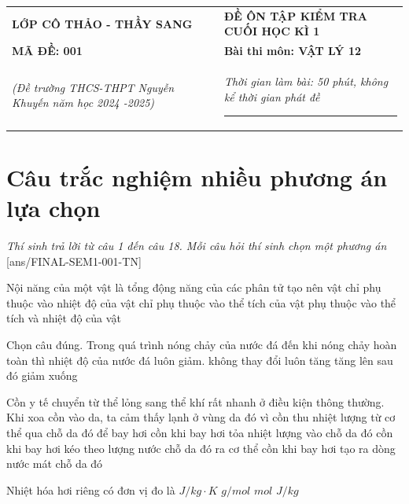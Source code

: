 \begin{tabular}{M{7.5cm}M{10.5cm}}
	\textbf{LỚP CÔ THẢO - THẦY SANG}& \textbf{ĐỀ ÔN TẬP KIỂM TRA CUỐI HỌC KÌ 1}\\
	\textbf{MÃ ĐỀ: 001}& \textbf{Bài thi môn: VẬT LÝ 12}\\
	\textit{(Đề trường THCS-THPT Nguyễn Khuyến năm học 2024 -2025)}& \textit{Thời gian làm bài: 50 phút, không kể thời gian phát đề}
	
	\noindent\rule{4cm}{0.8pt} \\
\end{tabular}
\setcounter{section}{0}
\section{Câu trắc nghiệm nhiều phương án lựa chọn}
\textit{Thí sinh trả lời từ câu 1 đến câu 18. Mỗi câu hỏi thí sinh chọn một phương án}
\setcounter{ex}{0}
[ans/FINAL-SEM1-001-TN]
\begin{ex}
	Nội năng của một vật
	\choice
	{là tổng động năng của các phân tử tạo nên vật}
	{chỉ phụ thuộc vào nhiệt độ của vật}
	{chỉ phụ thuộc vào thể tích của vật}
	{\True phụ thuộc vào thể tích và nhiệt độ của vật}
	\loigiai{}
\end{ex}
\begin{ex}
	Chọn câu đúng. Trong quá trình nóng chảy của nước đá đến khi nóng chảy hoàn toàn thì nhiệt độ của nước đá 
	\choice
	{luôn giảm.}
	{\True không thay đổi}
	{luôn tăng}
	{tăng lên sau đó giảm xuống}
	\loigiai{}
\end{ex}
\begin{ex}
	Cồn y tế chuyển từ thể lỏng sang thể khí rất nhanh ở điều kiện thông thường. Khi xoa cồn vào da, ta cảm thấy lạnh ở vùng da đó vì
	\choice
	{\True cồn thu nhiệt lượng từ cơ thể qua chỗ da đó để bay hơi}
	{cồn khi bay hơi tỏa nhiệt lượng vào chỗ da đó}
	{cồn khi bay hơi kéo theo lượng nước chỗ da đó ra cơ thể}
	{cồn khi bay hơi tạo ra dòng nước mát chỗ da đó}
	\loigiai{}
\end{ex}
\begin{ex}
	Nhiệt hóa hơi riêng có đơn vị đo là
	\choice
	{$\si{J/kg\cdot K}$}
	{$\si{g/mol}$}
	{$\si{mol}$}
	{\True $\si{J/kg}$}
	\loigiai{}
\end{ex}
